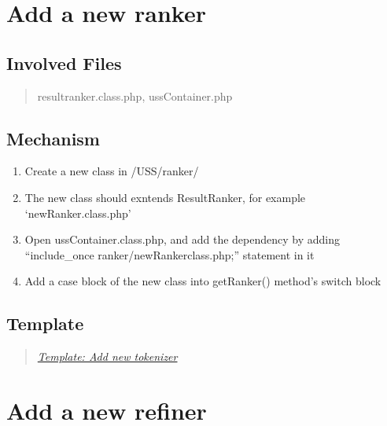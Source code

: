 \documentclass[letterpaper,10pt,english]{sphinxmanual}
\begin{document}
\section{Add a new ranker}
\label{docs/hooks/new_ranker:add-a-new-ranker}\label{docs/hooks/new_ranker::doc}\label{docs/hooks/new_ranker:hook-ranker}

\subsection{Involved Files}
\label{docs/hooks/new_ranker:involved-files}\begin{quote}

resultranker.class.php, ussContainer.php
\end{quote}


\subsection{Mechanism}
\label{docs/hooks/new_ranker:mechanism}\begin{enumerate}
\item {} 
Create a new class in /USS/ranker/

\item {} 
The new class should exntends ResultRanker, for example `newRanker.class.php'

\item {} 
Open ussContainer.class.php, and add the dependency by adding ``include\_once ranker/newRankerclass.php;'' statement in it

\item {} 
Add a case block of the new class into getRanker() method's switch block

\end{enumerate}


\subsection{Template}
\label{docs/hooks/new_ranker:template}\begin{quote}

{\hyperref[docs/hooks/t_tokenizer:hook-template-uss]{\emph{Template: Add new tokenizer}}}
\end{quote}


\section{Add a new refiner}
\label{docs/hooks/new_refiner:add-a-new-refiner}\label{docs/hooks/new_refiner::doc}\label{docs/hooks/new_refiner:hook-refiner}
\end{document}

